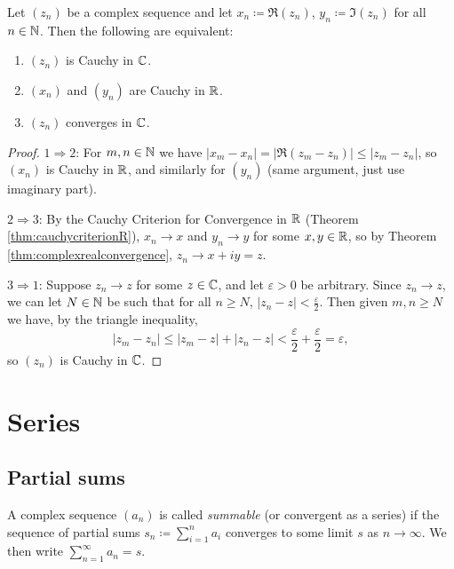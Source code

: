 \documentclass[../analysis1.tex]{subfiles}
\begin{document}
\begin{theorem}
    \begin{shaded*}
        Let $(z_n)$ be a complex sequence and let $x_n\coloneqq \Re(z_n)$, $y_n\coloneqq \Im(z_n)$ for all $n\in\mathbb{N}$. Then the following are equivalent:
        \begin{enumerate}
            \item[1.] $(z_n)$ is Cauchy in $\mathbb{C}$.
            \item[2.] $(x_n)$ and $(y_n)$ are Cauchy in $\mathbb{R}$.
            \item[3.] $(z_n)$ converges in $\mathbb{C}$. 
        \end{enumerate}
    \end{shaded*}
\end{theorem}
\begin{proof}
    $1\Rightarrow 2$: For $m,n\in\mathbb{N}$ we have $|x_m-x_n|=|\Re(z_m-z_n)|\le |z_m-z_n|$, so $(x_n)$ is Cauchy in $\mathbb{R}$, and similarly for $(y_n)$ (same argument, just use imaginary part).\par
    $2\Rightarrow 3$: By the Cauchy Criterion for Convergence in $\mathbb{R}$ (Theorem \ref{thm:cauchycriterionR}), $x_n\to x$ and $y_n\to y$ for some $x,y\in\mathbb{R}$, so by Theorem \ref{thm:complexrealconvergence}, $z_n\to x+iy=z$.\par
    $3\Rightarrow 1$: Suppose $z_n\to z$ for some $z\in\mathbb{C}$, and let $\varepsilon>0$ be arbitrary. Since $z_n\to z$, we can let $N\in\mathbb{N}$ be such that for all $n\ge N$, $|z_n-z|<\frac{\varepsilon}{2}$. Then given $m,n\ge N$ we have, by the triangle inequality, $$|z_m-z_n|\le |z_m-z|+|z_n-z|<\frac{\varepsilon}{2}+\frac{\varepsilon}{2}=\varepsilon,$$so $(z_n)$ is Cauchy in $\mathbb{C}$.\qedhere
\end{proof}



\section{Series}

\subsection{Partial sums}

\begin{definition}
    \begin{shaded*}
        A complex sequence $(a_n)$ is called \textit{summable} (or convergent as a series) if the sequence of partial sums $s_n \coloneqq \sum_{i=1}^n a_i$ converges to some limit $s$ as $n \to \infty$. We then write $\sum_{n=1}^\infty a_n = s$.
    \end{shaded*}
\end{definition}
\end{document}
